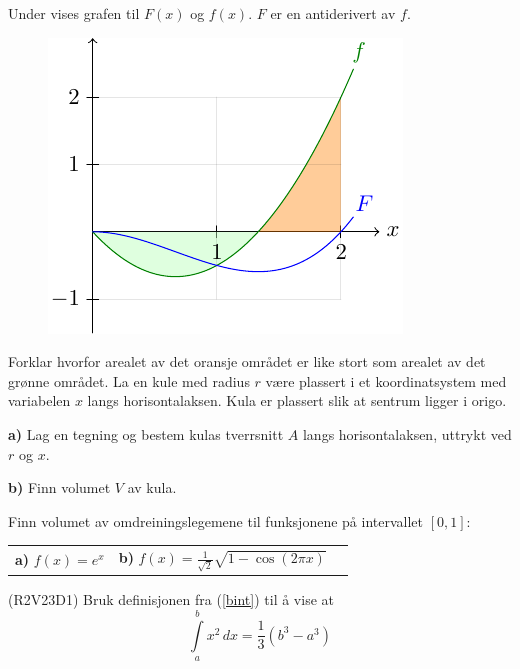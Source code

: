 Under vises grafen til $ F(x) $ og $ f(x) $. $ F $ er en antiderivert av $ f $.
\begin{figure}
	\centering
	\includegraphics[scale=0.9]{../fig/faropg}\\
	\raggedright
\end{figure}
Forklar hvorfor arealet av det oransje området er like stort som arealet av det grønne området.
\newpage
\nes
{}
La en kule med radius $ r $ være plassert i et koordinatsystem med variabelen $ x $ langs horisontalaksen. Kula er plassert slik at sentrum ligger i origo.\os

\textbf{a)} Lag en tegning og bestem kulas tverrsnitt $ A $ langs horisontalaksen, uttrykt ved $ r $ og $ x $.\os

\textbf{b)} Finn volumet $ V $ av kula.

Finn volumet av omdreiningslegemene til funksjonene på intervallet $ [0, 1] $:\os

\begin{tabular}{@{}l l l}	
	\textbf{a)} $ f(x)=e^x  $&\quad\textbf{b)} $\displaystyle f(x)= \frac{1}{\sqrt{2}}\sqrt{1-\cos(2 \pi x)}$ &\quad
\end{tabular}
\newpage
{}
(R2V23D1)
Bruk definisjonen fra (\ref{bint}) til å vise at
\[ \int\limits_a^b x^2 \,dx = \frac{1}{3}(b^3-a^3) \]

